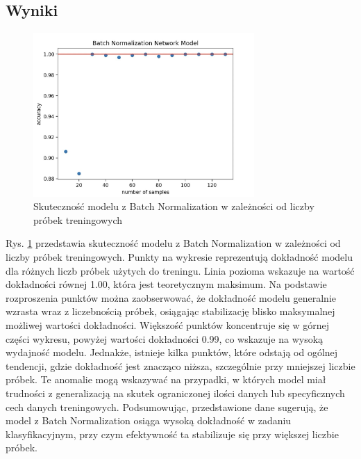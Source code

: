 \documentclass{article}
\begin{document}
\subsection{Wyniki}

\begin{figure}[H]
    \centering
    \includegraphics[width=0.75\textwidth]{batch_normalization/dokladnosc.png}
    \caption{Skuteczność modelu z Batch Normalization w zależności od liczby próbek treningowych}
    \label{fig:data_chart6}
\end{figure}

Rys. \ref{fig:data_chart6} przedstawia skuteczność modelu z Batch Normalization w zależności od liczby próbek treningowych. Punkty na wykresie reprezentują dokładność modelu dla różnych liczb próbek użytych do treningu. Linia pozioma wskazuje na wartość dokładności równej 1.00, która jest teoretycznym maksimum. Na podstawie rozproszenia punktów można zaobserwować, że dokładność modelu generalnie wzrasta wraz z liczebnością próbek, osiągając stabilizację blisko maksymalnej możliwej wartości dokładności. Większość punktów koncentruje się w górnej części wykresu, powyżej wartości dokładności 0.99, co wskazuje na wysoką wydajność modelu. Jednakże, istnieje kilka punktów, które odstają od ogólnej tendencji, gdzie dokładność jest znacząco niższa, szczególnie przy mniejszej liczbie próbek. Te anomalie mogą wskazywać na przypadki, w których model miał trudności z generalizacją na skutek ograniczonej ilości danych lub specyficznych cech danych treningowych. Podsumowując, przedstawione dane sugerują, że model z Batch Normalization osiąga wysoką dokładność w zadaniu klasyfikacyjnym, przy czym efektywność ta stabilizuje się przy większej liczbie próbek.
\end{document}
